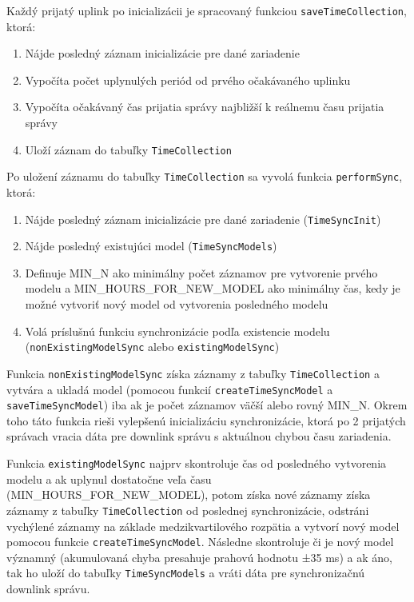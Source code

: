 Každý prijatý uplink po inicializácii je spracovaný funkciou \texttt{saveTimeCollection}, ktorá:
\begin{enumerate}
    \item Nájde posledný záznam inicializácie pre dané zariadenie
    \item Vypočíta počet uplynulých periód od prvého očakávaného uplinku
    \item Vypočíta očakávaný čas prijatia správy najbližší k reálnemu času prijatia správy
    \item Uloží záznam do tabuľky \texttt{TimeCollection}
\end{enumerate}
Po uložení záznamu do tabuľky \texttt{TimeCollection} sa vyvolá funkcia \texttt{performSync}, ktorá:
\begin{enumerate}
    \item Nájde posledný záznam inicializácie pre dané zariadenie (\texttt{TimeSyncInit})
    \item Nájde posledný existujúci model (\texttt{TimeSyncModels})
    \item Definuje MIN\_N ako minimálny počet záznamov pre vytvorenie prvého modelu a MIN\_HOURS\_FOR\_NEW\_MODEL ako minimálny čas, kedy je možné vytvoriť nový model od vytvorenia posledného modelu
    \item Volá príslušnú funkciu synchronizácie podľa existencie modelu (\texttt{nonExistingModelSync} alebo \texttt{existingModelSync})
\end{enumerate}

Funkcia \texttt{nonExistingModelSync} získa záznamy z tabuľky \texttt{TimeCollection} a vytvára a ukladá model (pomocou funkcií \texttt{createTimeSyncModel} a \texttt{saveTimeSyncModel}) iba ak je počet záznamov väčší alebo rovný MIN\_N. Okrem toho táto funkcia rieši vylepšenú inicializáciu synchronizácie, ktorá po 2 prijatých správach vracia dáta pre downlink správu s aktuálnou chybou času zariadenia.

Funkcia \texttt{existingModelSync} najprv skontroluje čas od posledného vytvorenia modelu a ak uplynul dostatočne veľa času (MIN\_HOURS\_FOR\_NEW\_MODEL), potom získa nové záznamy získa záznamy z tabuľky \texttt{TimeCollection} od poslednej synchronizácie, odstráni vychýlené záznamy na základe medzikvartilového rozpätia a vytvorí nový model pomocou funkcie \texttt{createTimeSyncModel}. Následne skontroluje či je nový model významný (akumulovaná chyba presahuje prahovú hodnotu ±35 ms) a ak áno, tak ho uloží do tabuľky \texttt{TimeSyncModels} a vráti dáta pre synchronizačnú downlink správu.

